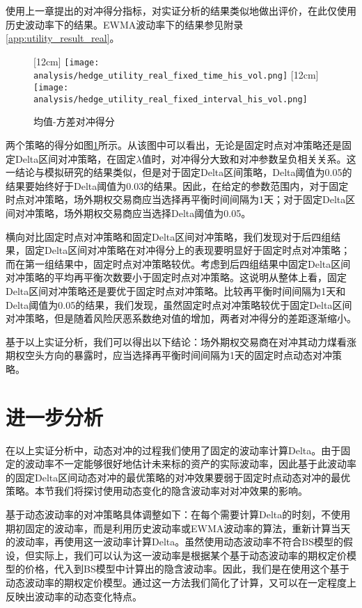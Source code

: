 使用上一章提出的对冲得分指标，对实证分析的结果类似地做出评价，在此仅使用历史波动率下的结果。EWMA波动率下的结果参见附录\ref{app:utility_result_real}。

\begin{figure}[htb]
  \centering
  [12cm]
    {\texttt{[image: analysis/hedge\_utility\_real\_fixed\_time\_his\_vol.png]}}
  \hspace{0.5cm}
  [12cm]
    {\texttt{[image: analysis/hedge\_utility\_real\_fixed\_interval\_his\_vol.png]}}
    \caption[这里将出现在插图索引中]
    {均值-方差对冲得分}
  \label{fig:hedge_utility_real}
\end{figure}

两个策略的得分如图\ref{fig:hedge_utility_real}所示。从该图中可以看出，无论是固定时点对冲策略还是固定Delta区间对冲策略，在固定$\lambda$值时，对冲得分大致和对冲参数呈负相关关系。这一结论与模拟研究的结果类似，但是对于固定Delta区间策略，Delta阈值为0.05的结果要始终好于Delta阈值为0.03的结果。因此，在给定的参数范围内，对于固定时点对冲策略，场外期权交易商应当选择再平衡时间间隔为1天；对于固定Delta区间对冲策略，场外期权交易商应当选择Delta阈值为0.05。

横向对比固定时点对冲策略和固定Delta区间对冲策略，我们发现对于后四组结果，固定Delta区间对冲策略在对冲得分上的表现要明显好于固定时点对冲策略；而在第一组结果中，固定时点对冲策略较优。考虑到后四组结果中固定Delta区间对冲策略的平均再平衡次数要小于固定时点对冲策略。这说明从整体上看，固定Delta区间对冲策略还是要优于固定时点对冲策略。比较再平衡时间间隔为1天和Delta阈值为0.05的结果，我们发现，虽然固定时点对冲策略较优于固定Delta区间对冲策略，但是随着风险厌恶系数绝对值的增加，两者对冲得分的差距逐渐缩小。

基于以上实证分析，我们可以得出以下结论：场外期权交易商在对冲其动力煤看涨期权空头方向的暴露时，应当选择再平衡时间间隔为1天的固定时点动态对冲策略。

\section{进一步分析}

在以上实证分析中，动态对冲的过程我们使用了固定的波动率计算Delta。由于固定的波动率不一定能够很好地估计未来标的资产的实际波动率，因此基于此波动率的固定Delta区间动态对冲的最优策略的对冲效果要弱于固定时点动态对冲的最优策略。本节我们将探讨使用动态变化的隐含波动率对对冲效果的影响。

基于动态波动率的对冲策略具体调整如下：在每个需要计算Delta的时刻，不使用期初固定的波动率，而是利用历史波动率或EWMA波动率的算法，重新计算当天的波动率，再使用这一波动率计算Delta。虽然使用动态波动率不符合BS模型的假设，但实际上，我们可以认为这一波动率是根据某个基于动态波动率的期权定价模型的价格，代入到BS模型中计算出的隐含波动率。因此，我们是在使用这个基于动态波动率的期权定价模型。通过这一方法我们简化了计算，又可以在一定程度上反映出波动率的动态变化特点。

